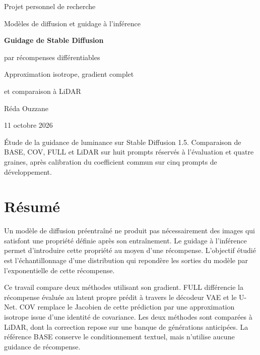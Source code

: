 \documentclass[11pt,a4paper]{article}
\begin{document}
\begin{titlepage}
\centering
\vspace*{1.3cm}
{\large Projet personnel de recherche\par}
\vspace{0.35cm}
{\large Modèles de diffusion et guidage à l'inférence\par}
\vspace{1.7cm}
{\LARGE\bfseries Guidage de Stable Diffusion\par par récompenses différentiables\par}
\vspace{0.6cm}
{\large Approximation isotrope, gradient complet\par et comparaison à LiDAR\par}
\vspace{1.7cm}
{\Large Réda Ouzzane\par}
\vspace{0.6cm}
{11 octobre 2026\par}
\vfill
\begin{minipage}{0.88\textwidth}
\small
Étude de la guidance de luminance sur Stable Diffusion 1.5. Comparaison de BASE, COV, FULL et LiDAR sur huit prompts réservés à l'évaluation et quatre graines, après calibration du coefficient commun sur cinq prompts de développement.
\end{minipage}
\vspace{0.9cm}
\end{titlepage}

\section*{Résumé}
Un modèle de diffusion préentraîné ne produit pas nécessairement des images qui satisfont une propriété définie après son entraînement. Le guidage à l'inférence permet d'introduire cette propriété au moyen d'une récompense. L'objectif étudié est l'échantillonnage d'une distribution qui repondère les sorties du modèle par l'exponentielle de cette récompense.

Ce travail compare deux méthodes utilisant son gradient. FULL différencie la récompense évaluée au latent propre prédit à travers le décodeur VAE et le U-Net. COV remplace le Jacobien de cette prédiction par une approximation isotrope issue d'une identité de covariance. Les deux méthodes sont comparées à LiDAR, dont la correction repose sur une banque de générations anticipées. La référence BASE conserve le conditionnement textuel, mais n'utilise aucune guidance de récompense.
\end{document}
